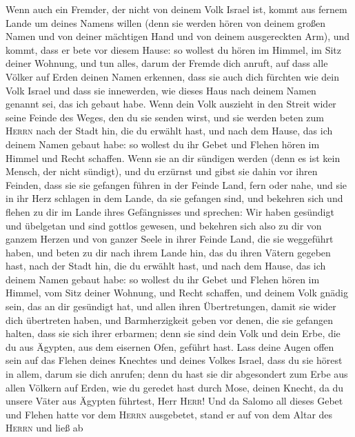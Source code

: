  Wenn auch ein Fremder, der nicht von deinem Volk Israel
ist, kommt aus fernem Lande um deines Namens willen 
(denn sie werden hören von deinem großen Namen und von deiner mächtigen
Hand und von deinem ausgereckten Arm), und kommt, dass er bete vor
diesem Hause:  so wollest du hören im Himmel, im Sitz
deiner Wohnung, und tun alles, darum der Fremde dich anruft, auf dass
alle Völker auf Erden deinen Namen erkennen, dass sie auch dich fürchten
wie dein Volk Israel und dass sie innewerden, wie dieses Haus nach
deinem Namen genannt sei, das ich gebaut habe.  Wenn dein
Volk auszieht in den Streit wider seine Feinde des Weges, den du sie
senden wirst, und sie werden beten zum \textsc{Herrn} nach der Stadt
hin, die du erwählt hast, und nach dem Hause, das ich deinem Namen
gebaut habe:  so wollest du ihr Gebet und Flehen hören im
Himmel und Recht schaffen.  Wenn sie an dir sündigen
werden (denn es ist kein Mensch, der nicht sündigt), und du erzürnst und
gibst sie dahin vor ihren Feinden, dass sie sie gefangen führen in der
Feinde Land, fern oder nahe,  und sie in ihr Herz
schlagen in dem Lande, da sie gefangen sind, und bekehren sich und
flehen zu dir im Lande ihres Gefängnisses und sprechen: Wir haben
gesündigt und übelgetan und sind gottlos gewesen,  und
bekehren sich also zu dir von ganzem Herzen und von ganzer Seele in
ihrer Feinde Land, die sie weggeführt haben, und beten zu dir nach ihrem
Lande hin, das du ihren Vätern gegeben hast, nach der Stadt hin, die du
erwählt hast, und nach dem Hause, das ich deinem Namen gebaut habe:
 so wollest du ihr Gebet und Flehen hören im Himmel, vom
Sitz deiner Wohnung, und Recht schaffen,  und deinem Volk
gnädig sein, das an dir gesündigt hat, und allen ihren Übertretungen,
damit sie wider dich übertreten haben, und Barmherzigkeit geben vor
denen, die sie gefangen halten, dass sie sich ihrer erbarmen;
 denn sie sind dein Volk und dein Erbe, die du aus
Ägypten, aus dem eisernen Ofen, geführt hast.  Lass deine
Augen offen sein auf das Flehen deines Knechtes und deines Volkes
Israel, dass du sie hörest in allem, darum sie dich anrufen;
 denn du hast sie dir abgesondert zum Erbe aus allen
Völkern auf Erden, wie du geredet hast durch Mose, deinen Knecht, da du
unsere Väter aus Ägypten führtest, Herr \textsc{Herr}! 
Und da Salomo all dieses Gebet und Flehen hatte vor dem \textsc{Herrn}
ausgebetet, stand er auf von dem Altar des \textsc{Herrn} und ließ ab
